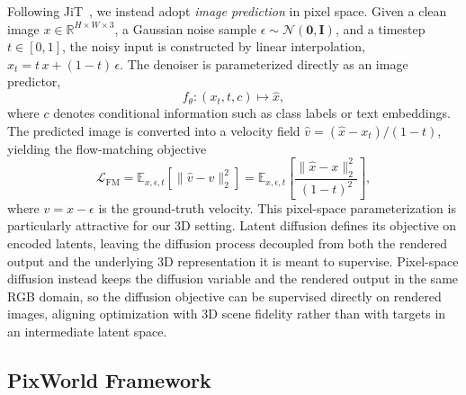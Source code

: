 Following JiT~\citep{li2025back}, we instead adopt \emph{image prediction} in pixel space. Given a clean image $x\in\mathbb{R}^{H\times W\times 3}$, a Gaussian noise sample $\epsilon\sim\mathcal{N}(\mathbf{0},\mathbf{I})$, and a timestep $t\in[0,1]$, the noisy input is constructed by linear interpolation, $x_t = t\,x + (1-t)\,\epsilon$. The denoiser is parameterized directly as an image predictor,
\begin{equation}
f_\theta : (x_t,t,c) \mapsto \hat{x},
\label{eq:prelim_xpred}
\end{equation}
where $c$ denotes conditional information such as class labels or text embeddings. The predicted image is converted into a velocity field $\hat{v}=(\hat{x}-x_t)/(1-t)$, yielding the flow-matching objective
\begin{equation}
\mathcal{L}_{\mathrm{FM}}
=
\mathbb{E}_{x,\epsilon,t}\!\left[\|\hat{v}-v\|_2^2\right]
=
\mathbb{E}_{x,\epsilon,t}\!\left[\frac{\|\hat{x}-x\|_2^2}{(1-t)^2}\right],
\label{eq:prelim_fm}
\end{equation}
where $v=x-\epsilon$ is the ground-truth velocity. This pixel-space parameterization is particularly attractive for our 3D setting. Latent diffusion defines its objective on encoded latents, leaving the diffusion process decoupled from both the rendered output and the underlying 3D representation it is meant to supervise. Pixel-space diffusion instead keeps the diffusion variable and the rendered output in the same RGB domain, so the diffusion objective can be supervised directly on rendered images, aligning optimization with 3D scene fidelity rather than with targets in an intermediate latent space.

\subsection{PixWorld Framework}
\label{sec:pixworld}

